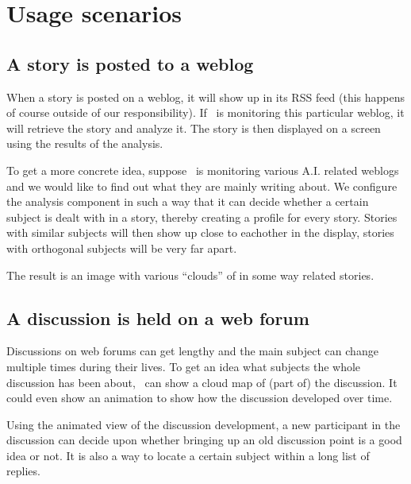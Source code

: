 \chapter{\label{cpt:scenarios}Usage scenarios}

\section{A story is posted to a weblog}

When a story is posted on a weblog, it will show up in its RSS feed (this
happens of course outside of our responsibility). If \Amber\ is monitoring this
particular weblog, it will retrieve the story and analyze it. The story is then
displayed on a screen using the results of the analysis.

To get a more concrete idea, suppose \Amber\ is monitoring various A.I. related
weblogs and we would like to find out what they are mainly writing about. We
configure the analysis component in such a way that it can decide whether a
certain subject is dealt with in a story, thereby creating a profile for every
story. Stories with similar subjects will then show up close to eachother in
the display, stories with orthogonal subjects will be very far apart.

The result is an image with various ``clouds'' of in some way related stories.

\section{A discussion is held on a web forum}

Discussions on web forums can get lengthy and the main subject can change
multiple times during their lives. To get an idea what subjects the whole
discussion has been about, \Amber\ can show a cloud map of (part of) the
discussion. It could even show an animation to show how the discussion
developed over time.

Using the animated view of the discussion development, a new participant in the
discussion can decide upon whether bringing up an old discussion point is a
good idea or not. It is also a way to locate a certain subject within a long
list of replies.

